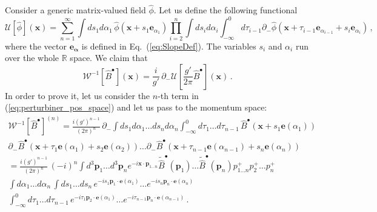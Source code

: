 \documentclass[english,american]{article}
\begin{document}
Consider a generic matrix-valued field $\hat{\phi}$. Let us define
the following functional
\begin{equation}
\mathcal{U}\left[\hat{\phi}\right]\left(\mathbf{x}\right)=\sum_{n=1}^{\infty}\int ds_{1}d\alpha_{1}\,\hat{\phi}\left(\mathbf{x}+s_{1}\mathbf{e}_{\alpha_{1}}\right)\prod_{i=2}^{n}\int ds_{i}d\alpha_{i}\int_{-\infty}^{0}d\tau_{i-1}\partial_{-}\hat{\phi}\left(\mathbf{x}+\tau_{i-1}\mathbf{e}_{\alpha_{i-1}}+s_{i}\mathbf{e}_{\alpha_{i}}\right)\,,\label{eq:U_functional}
\end{equation}
where the vector $\mathbf{e_{\alpha}}$ is defined in Eq.~(\ref{eq:SlopeDef}).
The variables $s_{i}$ and $\alpha_{i}$ run over the whole $\mathbb{R}$
space. We claim that 
\begin{equation}
\mathcal{W}^{-1}\left[\hat{B}^{\bullet}\right]\left(\mathbf{x}\right)=\frac{i}{g'}\,\partial_{-}\mathcal{U}\left[\frac{g'}{2\pi}\hat{B}^{\bullet}\right]\left(\mathbf{x}\right)\,.\label{eq:perturbiner_pos_space}
\end{equation}
In order to prove it, let us consider the $n$-th term in (\ref{eq:perturbiner_pos_space})
and let us pass to the momentum space:
\begin{multline}
\mathcal{W}^{-1}\left[\hat{B}^{\bullet}\right]^{\left(n\right)}=\frac{i\left(g'\right)^{n-1}}{\left(2\pi\right)^{n}}\,\partial_{-}\int ds_{1}d\alpha_{1}\dots ds_{n}d\alpha_{n}\int_{-\infty}^{0}d\tau_{1}\dots d\tau_{n-1}\,\hat{B}^{\bullet}\left(\mathbf{x}+s_{1}\mathbf{e}\left(\alpha_{1}\right)\right)\\
\partial_{-}\hat{B}^{\bullet}\left(\mathbf{x}+\tau_{1}\mathbf{e}\left(\alpha_{1}\right)+s_{2}\mathbf{e}\left(\alpha_{2}\right)\right)\dots\partial_{-}\hat{B}^{\bullet}\left(\mathbf{x}+\tau_{n-1}\mathbf{e}\left(\alpha_{n-1}\right)+s_{n}\mathbf{e}\left(\alpha_{n}\right)\right)\\
=\frac{i\left(g'\right)^{n-1}}{\left(2\pi\right)^{n}}\,\left(-i\right)^{n}\int d^{3}\mathbf{p}_{1}\dots d^{3}\mathbf{p}_{n}e^{-i\mathbf{x}\cdot\mathbf{p}_{1\dots n}}\tilde{\hat{B}}^{\bullet}\left(\mathbf{p}_{1}\right)\dots\tilde{\hat{B}}^{\bullet}\left(\mathbf{p}_{n}\right)p_{1\dots n}^{+}p_{2}^{+}\dots p_{n}^{+}\\
\int d\alpha_{1}\dots d\alpha_{n}\,\int ds_{1}\dots ds_{n}\, e^{-is_{1}\mathbf{p}_{1}\cdot\mathbf{e}\left(\alpha_{1}\right)}\dots e^{-is_{n}\mathbf{p}_{n}\cdot\mathbf{e}\left(\alpha_{n}\right)}\\
\int_{-\infty}^{0}d\tau_{1}\dots d\tau_{n-1}\, e^{-i\tau_{1}\mathbf{p}_{2}\cdot\mathbf{e}\left(\alpha_{1}\right)}\dots e^{-i\tau_{n-1}\mathbf{p}_{n}\cdot\mathbf{e}\left(\alpha_{n-1}\right)}\,.
\end{multline}
\end{document}
